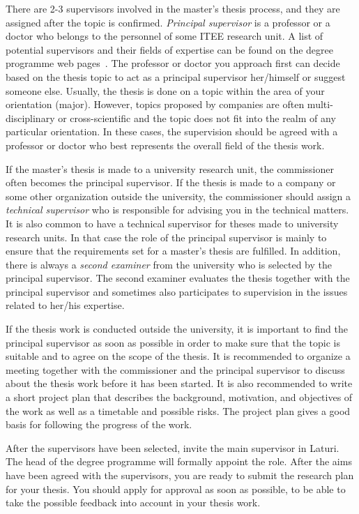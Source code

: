 There are 2-3 supervisors involved in the master’s thesis process, and they are assigned after the topic is confirmed. \textit{Principal supervisor} is a professor or a doctor who belongs to the personnel of some ITEE research unit. A list of potential supervisors and their fields of expertise can be found on the degree programme web pages~\cite{mscstudies}. The professor or doctor you approach first can decide based on the thesis topic to act as a principal supervisor her/himself or suggest someone else.  Usually, the thesis is done on a topic within the area of your orientation (major).  However, topics proposed by companies are often multi-disciplinary or cross-scientific  and the topic does not fit into the realm of any particular orientation. In these cases, the supervision should be agreed with a professor or doctor who best represents the overall field of the thesis work.

If the master’s thesis is made to a university research unit, the commissioner often becomes the principal supervisor. If the thesis is made to a company or some other organization outside the university, the commissioner should assign a \textit{technical supervisor} who is responsible for advising you in the technical matters. It is also common to have a technical supervisor for theses made to university research units. In that case the role of the principal supervisor is mainly to ensure that the requirements set for a master’s thesis are fulfilled. In addition, there is always a \textit{second examiner} from the university who is selected by the principal supervisor. The second examiner evaluates the thesis together with the principal supervisor and sometimes also participates to supervision in the issues related to her/his expertise.

If the thesis work is conducted outside the university, it is important to find the principal supervisor as soon as possible in order to make sure that the topic is suitable and to agree on the scope of the thesis. It is recommended to organize a meeting together with the commissioner and the principal supervisor to discuss about the thesis work before it has been started. It is also recommended to write a short project plan that describes the background, motivation, and objectives of the work as well as a timetable and possible risks. The project plan gives a good basis for following the progress of the work.

After the supervisors have been selected, invite the main supervisor in Laturi. The head of the degree programme will formally appoint the role. After the aims have been agreed with the supervisors, you are ready to submit the research plan for your thesis.  You should apply for approval as soon as possible, to be able to take the possible feedback into account in your thesis work. 

